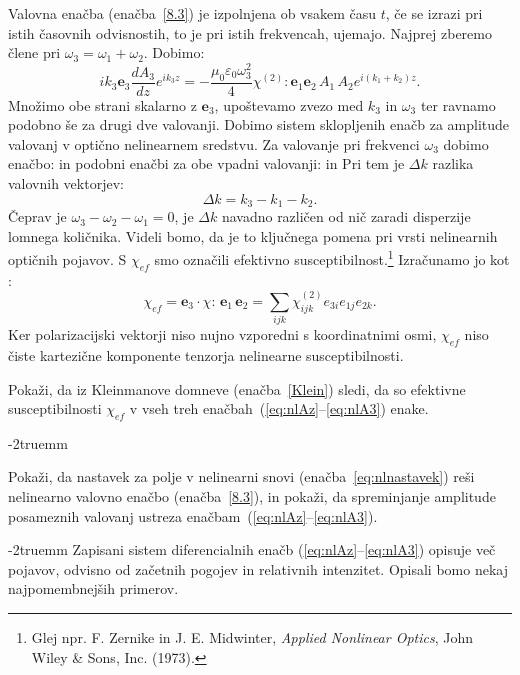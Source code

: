 Valovna enačba (enačba~\ref{8.3}) je izpolnjena ob vsakem času $t$, če se izrazi 
pri istih časovnih odvisnostih, to je pri istih frekvencah, ujemajo. Najprej 
zberemo člene pri $\omega_3 = \omega_1 + \omega_2$. Dobimo:
\begin{equation}
ik_{3}\mathbf{e}_{3}\frac{dA_{3}}{dz}e^{ik_{3}z}=-\frac{\mu_{0} 
\varepsilon_0 \omega_{3}^{2}}{4}\chi^{(2)}:\mathbf{e}_{1}\mathbf{e}_{2}\,A_{1}\,A_{2}e^{i(k_{1}+k_{2})z}.
\label{8.7}
\end{equation}
Množimo obe strani skalarno z $\mathbf{e}_{3}$, upoštevamo zvezo med $k_{3}$ in $\omega_{3}$
ter ravnamo podobno še za drugi dve valovanji. Dobimo sistem sklopljenih
enačb za amplitude valovanj v optično nelinearnem sredstvu. Za valovanje pri frekvenci $\omega_3$
dobimo enačbo:
in podobni enačbi za obe vpadni valovanji:
in 
Pri tem je $\Delta k$ razlika valovnih vektorjev:
\begin{equation}
\Delta k = k_{3}-k_{1}-k_{2}.
\end{equation}
Čeprav je $\omega_{3}-\omega_{2}-\omega_{1}=0$, je $\Delta k$ navadno različen od nič zaradi 
disperzije lomnega količnika. Videli bomo, da je to ključnega pomena 
pri vrsti nelinearnih optičnih pojavov. S $\chi_{ef}$ smo označili efektivno susceptibilnost.\footnote{Glej npr. F. Zernike in J. E. Midwinter, 
{\it Applied Nonlinear Optics}, John Wiley \& Sons, Inc. (1973).}
Izračunamo jo kot :
\begin{equation}
\chi_{ef}=\mathbf{e}_{3}\cdot\chi:\,\mathbf{e}_{1}\,\mathbf{e}_{2} = 
\sum_{ijk} \chi_{ijk}^{(2)} e_{3i} e_{1j} e_{2k}.
\label{eq:chicomp}
\end{equation}
Ker polarizacijski vektorji niso nujno vzporedni s koordinatnimi osmi, $\chi_{ef}$ 
niso čiste kartezične komponente tenzorja nelinearne susceptibilnosti.
\begin{naloga}
Pokaži, da iz Kleinmanove domneve (enačba~\ref{Klein}) sledi, da so 
efektivne susceptibilnosti $\chi_{ef}$ v vseh treh enačbah~(\ref{eq:nlAz}--\ref{eq:nlA3}) enake.
\end{naloga}
\vglue-2truemm
\begin{naloga}
Pokaži, da nastavek za polje v nelinearni snovi (enačba~\ref{eq:nlnastavek}) reši nelinearno
valovno enačbo (enačba~\ref{8.3}), in pokaži, da spreminjanje amplitude posameznih valovanj 
ustreza enačbam~(\ref{eq:nlAz}--\ref{eq:nlA3}).
\end{naloga}
\vglue-2truemm
Zapisani sistem diferencialnih enačb (\ref{eq:nlAz}--\ref{eq:nlA3}) opisuje več pojavov, 
odvisno od začetnih pogojev in relativnih intenzitet. Opisali bomo nekaj
najpomembnejših primerov.

